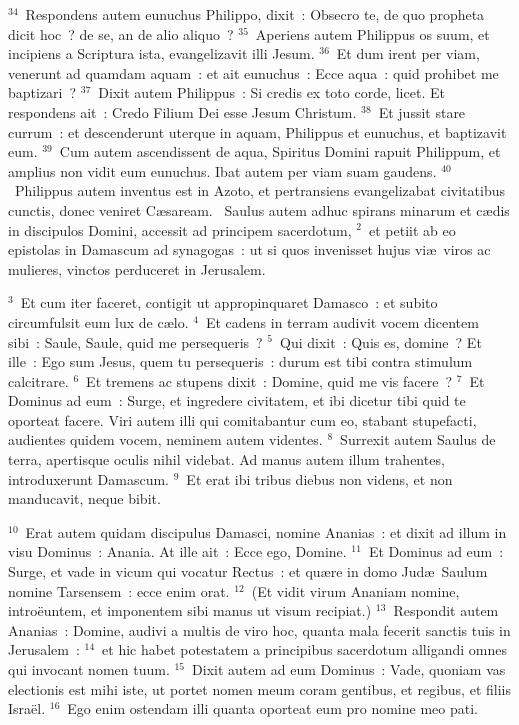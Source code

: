 ${}^{34}$~Respondens autem eunuchus Philippo, dixit~: Obsecro te, de quo propheta dicit hoc~? de se, an de alio aliquo~?
${}^{35}$~Aperiens autem Philippus os suum, et incipiens a Scriptura ista, evangelizavit illi Jesum.
${}^{36}$~Et dum irent per viam, venerunt ad quamdam aquam~: et ait eunuchus~: Ecce aqua~: quid prohibet me baptizari~?
${}^{37}$~Dixit autem Philippus~: Si credis ex toto corde, licet. Et respondens ait~: Credo Filium Dei esse Jesum Christum.
${}^{38}$~Et jussit stare currum~: et descenderunt uterque in aquam, Philippus et eunuchus, et baptizavit eum.
${}^{39}$~Cum autem ascendissent de aqua, Spiritus Domini rapuit Philippum, et amplius non vidit eum eunuchus. Ibat autem per viam suam gaudens.
${}^{40}$~Philippus autem inventus est in Azoto, et pertransiens evangelizabat civitatibus cunctis, donec veniret C\ae saream.
~Saulus autem adhuc spirans minarum et c\ae dis in discipulos Domini, accessit ad principem sacerdotum,
${}^{2}$~et petiit ab eo epistolas in Damascum ad synagogas~: ut si quos invenisset hujus vi\ae\ viros ac mulieres, vinctos perduceret in Jerusalem.


${}^{3}$~Et cum iter faceret, contigit ut appropinquaret Damasco~: et subito circumfulsit eum lux de c\ae lo.
${}^{4}$~Et cadens in terram audivit vocem dicentem sibi~: Saule, Saule, quid me persequeris~?
${}^{5}$~Qui dixit~: Quis es, domine~? Et ille~: Ego sum Jesus, quem tu persequeris~: durum est tibi contra stimulum calcitrare.
${}^{6}$~Et tremens ac stupens dixit~: Domine, quid me vis facere~?
${}^{7}$~Et Dominus ad eum~: Surge, et ingredere civitatem, et ibi dicetur tibi quid te oporteat facere. Viri autem illi qui comitabantur cum eo, stabant stupefacti, audientes quidem vocem, neminem autem videntes.
${}^{8}$~Surrexit autem Saulus de terra, apertisque oculis nihil videbat. Ad manus autem illum trahentes, introduxerunt Damascum.
${}^{9}$~Et erat ibi tribus diebus non videns, et non manducavit, neque bibit.


${}^{10}$~Erat autem quidam discipulus Damasci, nomine Ananias~: et dixit ad illum in visu Dominus~: Anania. At ille ait~: Ecce ego, Domine.
${}^{11}$~Et Dominus ad eum~: Surge, et vade in vicum qui vocatur Rectus~: et qu\ae re in domo Jud\ae\ Saulum nomine Tarsensem~: ecce enim orat.
${}^{12}$~(Et vidit virum Ananiam nomine, intro\"euntem, et imponentem sibi manus ut visum recipiat.)
${}^{13}$~Respondit autem Ananias~: Domine, audivi a multis de viro hoc, quanta mala fecerit sanctis tuis in Jerusalem~:
${}^{14}$~et hic habet potestatem a principibus sacerdotum alligandi omnes qui invocant nomen tuum.
${}^{15}$~Dixit autem ad eum Dominus~: Vade, quoniam vas electionis est mihi iste, ut portet nomen meum coram gentibus, et regibus, et filiis Isra\"el.
${}^{16}$~Ego enim ostendam illi quanta oporteat eum pro nomine meo pati.


